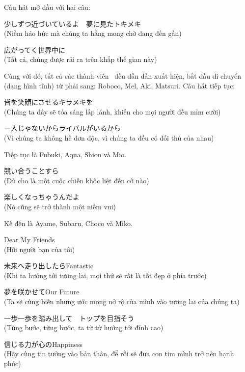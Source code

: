 \documentclass[../main.tex]{subfiles}
\begin{document}
Câu hát mở đầu với hai câu:

\begin{center}
  少しずつ近づいているよ　夢に見たトキメキ \\
  (Niềm háo hức mà chúng ta hằng mong chờ đang đến gần)

  広がってく世界中に \\
  (Tất cả, chúng được rải ra trên khắp thế gian này)
\end{center}

Cùng với đó, tất cả các thành viên \hll\ đều dần dần xuất hiện, bắt đầu di chuyển (dạng hình tĩnh) từ phải sang: Roboco, Mel, Aki, Matsuri. Câu hát tiếp tục:

\begin{center}
  皆を笑顔にさせるキラメキを \\
  (Chúng ta đây sẽ tỏa sáng lấp lánh, khiến cho mọi người đều mỉm cười)

  一人じゃないからライバルがいるから \\
  (Vì chúng ta không hề đơn độc, vì chúng ta đều có đối thủ của nhau)
\end{center}

Tiếp tục là Fubuki, Aqua, Shion và Mio.

\begin{center}
  競い合うことすら \\
  (Dù cho là một cuộc chiến khốc liệt đến cỡ nào)

  楽しくなっちゃうんだよ \\
  (Nó cũng sẽ trở thành một niềm vui)
\end{center}

Kế đến là Ayame, Subaru, Choco và Miko.

\begin{center}
  {\fotskip Dear My Friends} \\
  (Hỡi người bạn của tôi)

  未来へ走り出したら{\fotskip Fantastic} \\
  (Khi ta hướng tới tương lai, mọi thứ sẽ rất là tốt đẹp ở phía trước)

  夢を咲かせて{\fotskip Our Future} \\
  (Ta sẽ cùng biến những ước mong nở rộ của mình vào tương lai của chúng ta)

  一歩一歩を踏み出して　トップを目指そう \\
  (Từng bước, từng bước, ta từ từ hướng tới đỉnh cao)

  信じる力が心の{\fotskip Happiness} \\
  (Hãy cùng tin tưởng vào bản thân, để rồi sẽ đưa con tim mình trở nên hạnh phúc)
\end{center}
\end{document}

